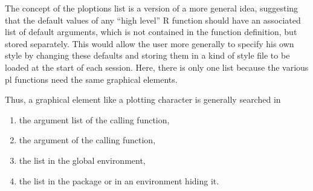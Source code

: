 \documentclass[11pt]{article}\usepackage[]{graphicx}\usepackage[]{color}
\begin{document}
The concept of the ploptions list is a version of a more general idea, 
suggesting that the default values of any ``high level'' R function should 
have an associated list of default arguments, which is not contained in 
the function definition, but stored separately. 
This would allow the user more generally to specify his own style by 
changing these defaults and storing them in a kind of style file to be 
loaded at the start of each session. 
Here, there is only one list because the various pl functions need the 
same graphical elements.

Thus, a graphical element like a plotting character is generally searched 
in
\begin{enumerate}
\item 
  the argument list of the calling function,
\item
  the  argument of the calling function,
\item
  the  list in the global environment,
\item
  the list  in the package 
  or in an environment hiding it.
\end{enumerate}
\end{document}
